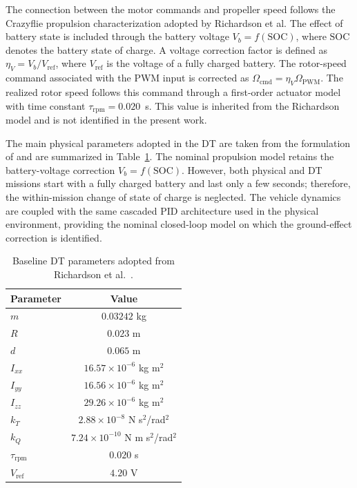 \documentclass[journal]{IEEEtran}
\begin{document}
The connection between the motor commands and propeller speed follows the Crazyflie propulsion characterization adopted by Richardson et al. The effect of battery state is included through the battery voltage $V_b=f(\mathrm{SOC})$, where $\mathrm{SOC}$ denotes the battery state of charge. A voltage correction factor is defined as $\eta_V=V_b/V_{\mathrm{ref}}$, where $V_{\mathrm{ref}}$ is the voltage of a fully charged battery. The rotor-speed command associated with the PWM input is corrected as $\Omega_{\mathrm{cmd}}=\eta_V\Omega_{\mathrm{PWM}}$. The realized rotor speed follows this command through a first-order actuator model with time constant $\tau_{\mathrm{rpm}}=0.020$~s. This value is inherited from the Richardson model and is not identified in the present work.

The main physical parameters adopted in the DT are taken from the formulation of \cite{Richardson2025} and are summarized in Table~\ref{tab:dt_parameters}. The nominal propulsion model retains the battery-voltage correction $V_b=f(\mathrm{SOC})$. However, both physical and DT missions start with a fully charged battery and last only a few seconds; therefore, the within-mission change of state of charge is neglected. The vehicle dynamics are coupled with the same cascaded PID architecture used in the physical environment, providing the nominal closed-loop model on which the ground-effect correction is identified.
\begin{table}[t]
\centering
\caption{Baseline DT parameters adopted from Richardson et al.~\cite{Richardson2025}.}
\label{tab:dt_parameters}
\begin{tabular}{lc}
\hline
Parameter & Value \\
\hline
$m$ & $0.03242$ kg\\
$R$ & $0.023$ m \\
$d$ & $0.065$ m \\
$I_{xx}$ & $16.57\times10^{-6}$ kg m$^2$ \\
$I_{yy}$ & $16.56\times10^{-6}$ kg m$^2$ \\
$I_{zz}$ & $29.26\times10^{-6}$ kg m$^2$ \\
$k_T$ & $2.88\times10^{-8}$ N s$^2$/rad$^2$ \\
$k_Q$ & $7.24\times10^{-10}$ N m s$^2$/rad$^2$ \\
$\tau_{\mathrm{rpm}}$ & $0.020$ s \\
$V_{\mathrm{ref}}$ & $4.20$ V \\
\hline
\end{tabular}
\end{table}
\end{document}
